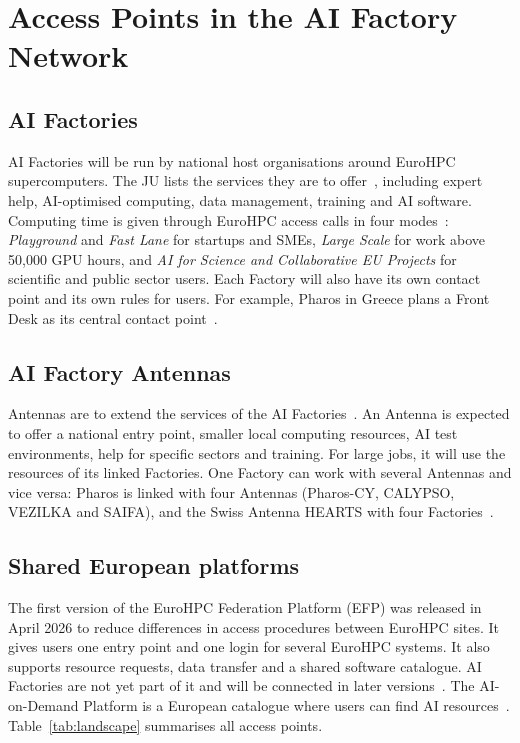 \documentclass[conference,a4paper]{IEEEtran}
\DeclareRobustCommand{\chg}[1]{#1}
\DeclareRobustCommand{\roz}[1]{#1}
\DeclareRobustCommand{\nov}[1]{#1}
\begin{document}
\section{\nov{Access Points in the AI Factory Network}}
\label{sec:access}

\subsection{AI Factories}
AI Factories \nov{will be} run by national host organisations around EuroHPC supercomputers. The JU lists the services they \nov{are to} offer~\cite{eurohpc_aif_services}\nov{, including expert help, AI-optimised computing, data management, training and AI software}. Computing time is given through EuroHPC access calls \roz{in four modes}~\cite{eurohpc_aif_access}\roz{: \emph{Playground} and \emph{Fast Lane}} \nov{for} \roz{startups and SMEs, \emph{Large Scale}} \nov{for work above} \roz{50,000 GPU hours, and \emph{AI for Science and Collaborative EU Projects} for scientific and public sector users}. Each Factory \nov{will} also \nov{have} its own \roz{contact point} and its own rules for users. \roz{For example, Pharos in Greece} \nov{plans} \roz{a Front Desk as its central contact point}~\cite{eurohpc_pharos}.

\subsection{AI Factory Antennas}
Antennas \nov{are to} extend the services of \nov{the} AI Factories~\cite{eurohpc_antennas_page}. An Antenna \nov{is expected to offer} a national entry point, smaller local computing resources, AI test environments, help for specific sectors and training. \nov{For large jobs, it will use the resources of its linked Factories.} One Factory can work with several Antennas \chg{and vice versa:} \nov{Pharos is linked with} four Antennas (Pharos-CY, CALYPSO, VEZILKA and SAIFA), and the Swiss Antenna HEARTS \chg{with} four Factories~\cite{eurohpc_antennas}.

\subsection{Shared European platforms}
The first version of the EuroHPC Federation Platform (EFP) was \chg{released} in April 2026 \nov{to reduce differences in access procedures between EuroHPC sites}. \roz{It gives users one entry point and one login for several EuroHPC systems.} \nov{It also supports resource requests, data transfer and a shared software catalogue.} \roz{AI Factories are not yet part of it and will be connected in later versions}~\cite{eurohpc_efp}. The AI-on-Demand Platform is a European catalogue where users can find AI resources~\cite{aiod}. Table~\ref{tab:landscape} \roz{summarises all access points}.
\end{document}
